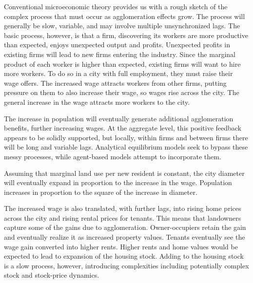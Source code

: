 {Conventional microeconomic theory  provides us with a rough sketch of the complex process that must occur as agglomeration effects grow. The process will generally be slow, variable, and may involve multiple unsynchronized lags. The basic process, however, is that a firm, discovering its workers are  more productive than expected, enjoys unexpected output and profits. Unexpected profits in existing firms will lead to new firms entering the industry. Since the marginal product of each worker is higher than expected, existing firms will  want to hire more workers. To do so in a city with full employment, they must raise their  wage offers.   The increased wage attracts workers from other firms, putting pressure on them to also increase their wage, so wages rise across the city. The general increase in the wage attracts more workers to the city.

The increase in population will eventually generate additional agglomeration benefits, further increasing wages. At the aggregate level, this positive feedback appears to be solidly supported, but locally, within firms and between firms there will be long and variable lags. Analytical equilibrium models seek to bypass these messy processes, while agent-based models attempt to incorporate them.

Assuming that marginal land use per new resident is constant, the city diameter will eventually expand in proportion to the increase in the wage.%
Population increases in proportion to the square of the increase in diameter. %

The increased wage is also translated, with further lags, into rising home prices across the city and rising rental prices for tenants. This means that landowners capture some of the gains due to agglomeration. Owner-occupiers retain the gain and eventually realize it as increased  property values. Tenants eventually see the wage gain converted into higher rents. Higher rents and home values would be expected to lead to expansion of the housing stock. Adding to the housing stock is a slow process, however, introducing complexities including potentially complex stock and stock-price dynamics. %


}
